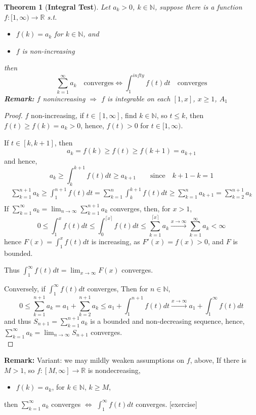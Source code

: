 \documentclass[12pt]{article}
\theoremstyle{plain}
\newtheorem{theorem}{Theorem}[subsection]
\newcommand{\ceil}[1]{\lceil #1 \rceil}
\newcommand{\mN}{{\mathbb{N}}}
\newcommand{\mR}{{\mathbb{R}}}
\begin{document}
\begin{theorem}[\textbf{Integral Test}]
	Let $a_k > 0$, $k \in \mN$, suppose there is a function $f:[1,\infty) \to
	\mR$ s.t. 
	\begin{itemize}
		\item $f(k) = a_k$ for $k \in \mN$, and
		\item $f$ is non-increasing
	\end{itemize}
	then 
	\[
		\sum_{k=1}^{\infty} a_k \quad \text{converges} \Leftrightarrow
		\int_1^{infty} f(t)dt \quad \text{converges}
	\]
	\textbf{Remark:} $f$ nonincreasing $\Rightarrow$ $f$ is integrable on 
	each $[1,x]$, $x \geq 1$, $A_1$ 
\end{theorem}
\begin{proof}
	$f$ non-increasing, if $t \in [1,\infty]$, find $k \in \mN$, so $t\leq k$,
	then $f(t) \geq f(k) = a_k > 0$, hence, $f(t) > 0$ for $t \in [1,\infty)$.

	If $t\in [k,k+1]$, then 
	\[
		a_k = f(k) \geq f(t) \geq f(k+1) = a_{k+1}
	\]
	and hence, 
	\[
		a_k \geq \int_k^{k+1}f(t)dt \geq a_{k+1} \qquad \text{since}\quad 
		k+1-k=1
	\]
	\begin{align*}
		\sum_{k=1}^{n+1}a_k \geq \int_1^{n+1} f(t)dt 
		= \sum_{k=1}^n \int_k^{k+1}f(t)dt
		\geq \sum_{k=1}^n a_{k+1} = \sum_{k=2}^{n+1}a_k	\tag{*}\\
	\end{align*}
	If $\sum_{k=1}^{\infty} a_k = \lim_{n\to\infty} \sum_{k=1}^{n+1} a_k$
	converges, then, for $x > 1$, 
	\[
		0 \leq \int_1^x f(t)dt \leq \int_0^{\ceil{x}} f(t)dt
		\leq \sum_{k=1}^{\ceil{x}}a_k \overset{x\to\infty}{\longrightarrow}
		\sum_{k=1}^{\infty} a_k < \infty
	\]
	hence $F(x) = \int_1^x f(t)dt$ is increasing, as $F'(x) = f(x) > 0$, and
	$F$ is bounded. 

	Thus $\int_1^{\infty}f(t)dt = \lim_{x\to \infty} F(x)$ converges. 

	Conversely, if $\int_1^{\infty}f(t)dt$ converges, Then for $n \in \mN$,
	\[
		0\leq \sum_{k=1}^{n+1} a_k = a_1 + \sum_{k=2}^{n+1}a_k 
		\leq a_1 + \int_1^{n+1} f(t)dt
		 \overset{x\to\infty}{\longrightarrow}
		 a_1 + \int_1^{\infty} f(t)dt
	\]
	and thus $S_{n+1} = \sum_{k=1}^{n+1}a_k$ is a bounded and non-decreasing 
	sequence, hence, $\sum_{k=1}^{\infty} a_k = \lim_{n\to\infty} S_{n+1}$
	converges. \\
\end{proof}

\textbf{Remark:} Variant: we may mildly weaken assumptions on $f$, above,
If there is $M > 1$, so $f:[M,\infty] \to \mR$ is nondecreasing, 
\begin{itemize}
	\item $f(k) = a_k$, for $k \in \mN$, $k \geq M$, 
\end{itemize}
then $\sum_{k=1}^{\infty} a_k$ converges $\Leftrightarrow$ $\int_1^{\infty} 
f(t)dt$ converges. [exercise]
\end{document}
